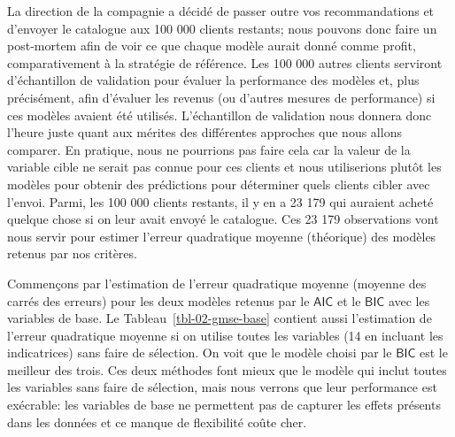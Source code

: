 \documentclass[
  11pt,
  letterpaper,
]{scrbook}
\theoremstyle{definition}
\theoremstyle{remark}
\begin{document}
La direction de la compagnie a décidé de passer outre vos
recommandations et d'envoyer le catalogue aux 100 000 clients restants;
nous pouvons donc faire un post-mortem afin de voir ce que chaque modèle
aurait donné comme profit, comparativement à la stratégie de référence.
Les 100 000 autres clients serviront d'échantillon de validation pour
évaluer la performance des modèles et, plus précisément, afin d'évaluer
les revenus (ou d'autres mesures de performance) si ces modèles avaient
été utilisés. L'échantillon de validation nous donnera donc l'heure
juste quant aux mérites des différentes approches que nous allons
comparer. En pratique, nous ne pourrions pas faire cela car la valeur de
la variable cible ne serait pas connue pour ces clients et nous
utiliserions plutôt les modèles pour obtenir des prédictions pour
déterminer quels clients cibler avec l'envoi. Parmi, les 100 000 clients
restants, il y en a 23 179 qui auraient acheté quelque chose si on leur
avait envoyé le catalogue. Ces 23 179 observations vont nous servir pour
estimer l'erreur quadratique moyenne (théorique) des modèles retenus par
nos critères.

Commençons par l'estimation de l'erreur quadratique moyenne (moyenne des
carrés des erreurs) pour les deux modèles retenus par le
\(\mathsf{AIC}\) et le \(\mathsf{BIC}\) avec les variables de base. Le
Tableau~\ref{tbl-02-gmse-base} contient aussi l'estimation de l'erreur
quadratique moyenne si on utilise toutes les variables (14 en incluant
les indicatrices) sans faire de sélection. On voit que le modèle choisi
par le \(\mathsf{BIC}\) est le meilleur des trois. Ces deux méthodes
font mieux que le modèle qui inclut toutes les variables sans faire de
sélection, mais nous verrons que leur performance est exécrable: les
variables de base ne permettent pas de capturer les effets présents dans
les données et ce manque de flexibilité coûte cher.
\end{document}
